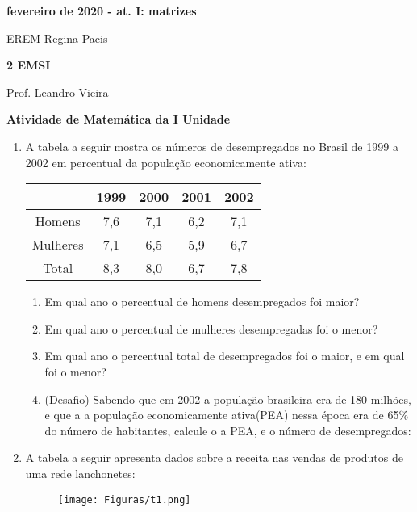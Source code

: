 \documentclass[oneside,a4paper,10pt]{article}
\newcommand{\EREM}{EREM Regina Pacis}
\newcommand{\curso}{\textbf{2 EMSI}}
\newcommand{\professor}{Prof. Leandro Vieira}
\begin{document}
\pagestyle{empty}
\textbf{fevereiro de 2020 - at. I: matrizes}

	\begin{center}
		\EREM
		\par %
		\curso
		\par
		\professor
		\par
		\vspace{10pt}
		\textbf{\large{Atividade de Matemática da I Unidade}}
	\end{center}
	
\begin{enumerate}
\item A tabela a seguir mostra os números de desempregados no Brasil de 1999 a 2002 em percentual da população economicamente ativa:

\begin{center}
\begin{tabular}{|c|c|c|c|c|}
\hline 
 & 1999 & 2000 & 2001 & 2002 \\ 
\hline 
Homens & 7,6 & 7,1 & 6,2 & 7,1 \\ 
\hline 
Mulheres & 7,1 & 6,5 & 5,9 & 6,7 \\ 
\hline 
Total & 8,3 & 8,0 & 6,7 & 7,8 \\ 
\hline 
\end{tabular} 
\end{center}

	\begin{enumerate}
	\item Em qual ano o percentual de homens desempregados foi maior?
	\item Em qual ano o percentual de mulheres desempregadas foi o menor?
	\item Em qual ano o percentual total de desempregados foi o maior, e em qual foi o menor?
	\item (Desafio) Sabendo que em 2002 a população brasileira era de 180 milhões, e que a a população economicamente ativa(PEA) nessa época era de 65\% do número de habitantes, calcule o a PEA, e o número de desempregados:
	\end{enumerate}
	
\item A tabela a seguir apresenta dados sobre a receita nas vendas de produtos de uma rede lanchonetes:
\begin{figure}[h]
\center
\texttt{[image: Figuras/t1.png]}
\label{omeubrowser}
\end{figure}


\end{enumerate}
\end{document}
